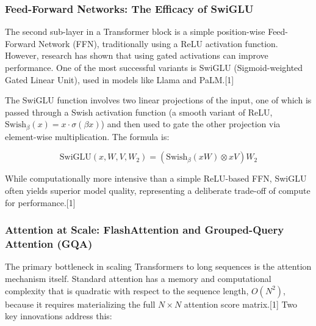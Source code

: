 \documentclass[12pt, a4paper]{article}
\begin{document}
\subsubsection{Feed-Forward Networks: The Efficacy of SwiGLU}

The second sub-layer in a Transformer block is a simple position-wise Feed-Forward Network (FFN), traditionally using a ReLU activation function. However, research has shown that using gated activations can improve performance. One of the most successful variants is SwiGLU (Sigmoid-weighted Gated Linear Unit), used in models like Llama and PaLM.[1]

The SwiGLU function involves two linear projections of the input, one of which is passed through a Swish activation function (a smooth variant of ReLU, $\text{Swish}_\beta(x) = x \cdot \sigma(\beta x)$) and then used to gate the other projection via element-wise multiplication. The formula is:

$$\text{SwiGLU}(x, W, V, W_2) = (\text{Swish}_\beta(xW) \otimes xV)W_2$$

While computationally more intensive than a simple ReLU-based FFN, SwiGLU often yields superior model quality, representing a deliberate trade-off of compute for performance.[1]

\subsubsection{Attention at Scale: FlashAttention and Grouped-Query Attention (GQA)}

The primary bottleneck in scaling Transformers to long sequences is the attention mechanism itself. Standard attention has a memory and computational complexity that is quadratic with respect to the sequence length, $O(N^2)$, because it requires materializing the full $N \times N$ attention score matrix.[1] Two key innovations address this:
\end{document}
